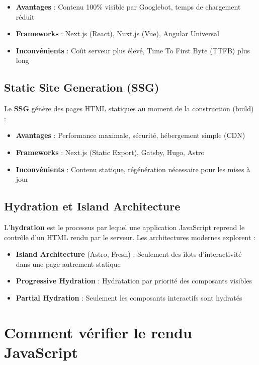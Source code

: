 \documentclass[12pt,a4paper,twoside]{report}
\newcommand{\keyword}[1]{\textbf{\textcolor{googleblue}{#1}}}
\begin{document}
\begin{itemize}
    \item \textbf{Avantages} : Contenu 100\% visible par Googlebot, temps de chargement réduit
    \item \textbf{Frameworks} : Next.js (React), Nuxt.js (Vue), Angular Universal
    \item \textbf{Inconvénients} : Coût serveur plus élevé, Time To First Byte (TTFB) plus long
\end{itemize}

\subsection{Static Site Generation (SSG)}

Le \keyword{SSG} génère des pages HTML statiques au moment de la construction (build) :

\begin{itemize}
    \item \textbf{Avantages} : Performance maximale, sécurité, hébergement simple (CDN)
    \item \textbf{Frameworks} : Next.js (Static Export), Gatsby, Hugo, Astro
    \item \textbf{Inconvénients} : Contenu statique, régénération nécessaire pour les mises à jour
\end{itemize}

\subsection{Hydration et Island Architecture}

L'\keyword{hydration} est le processus par lequel une application JavaScript reprend le contrôle d'un HTML rendu par le serveur. Les architectures modernes explorent :

\begin{itemize}
    \item \textbf{Island Architecture} (Astro, Fresh) : Seulement des îlots d'interactivité dans une page autrement statique
    \item \textbf{Progressive Hydration} : Hydratation par priorité des composants visibles
    \item \textbf{Partial Hydration} : Seulement les composants interactifs sont hydratés
\end{itemize}

\section{Comment vérifier le rendu JavaScript}
\end{document}
